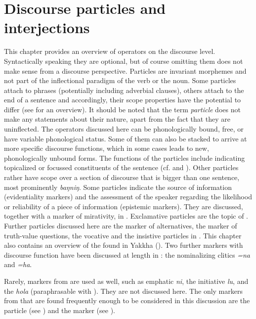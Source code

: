 ﻿\chapter{Discourse particles and interjections}\label{particles}

This chapter provides an overview of operators on the discourse level. Syntactically speaking they are optional, but of course omitting them does not make sense from a discourse perspective. Particles are invariant morphemes and not part of the inflectional paradigm of the verb or the noun. Some particles attach to phrases (potentially including adverbial clauses), others attach to the end of a sentence and accordingly, their scope properties have the potential to differ (see  for an overview). It should be noted that the term \emph{particle} does not make any statements about their nature, apart from the fact that they are uninflected. The operators discussed here can be phonologically bound,  free, or have  variable phonological status. Some of them can also  be stacked to arrive at more specific discourse functions, which in some cases leads to new, phonologically unbound forms. 
The functions of the particles include indicating topicalized or focussed constituents of the sentence (cf.  and ). Other particles rather have scope over a section of discourse that is bigger than one sentence, most prominently \emph{baŋniŋ}. Some particles indicate the source of information (evidentiality markers) and the assessment of the speaker regarding the likelihood or reliability of a piece of information (epistemic markers). They are discussed, together with a marker of mirativity, in . Exclamative particles are the topic of . Further particles discussed here are the marker of alternatives, the marker of truth-value questions, the vocative and the insistive particles in .  This chapter also contains an overview of the  found in Yakkha (). Two further markers with discourse function have been discussed at length in : the nominalizing clitics \emph{=na} and \emph{=ha}. 

Rarely, markers from  are used as well, such as emphatic \emph{ni}, the initiative \emph{lu}, and the  \emph{hola} (paraphrasable with ). They are not discussed here. The only markers from  that are found frequently enough to be considered in this discussion are the  particle (see ) and the  marker  (see ).

